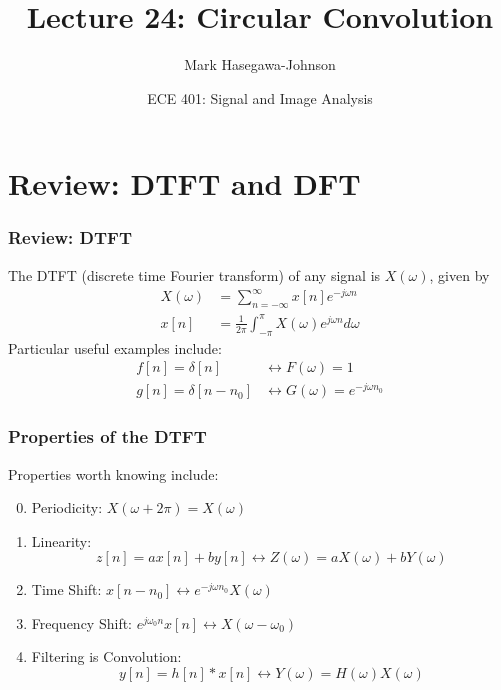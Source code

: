\documentclass{beamer}
\title{Lecture 24: Circular Convolution}
\author{Mark Hasegawa-Johnson}
\date{ECE 401: Signal and Image Analysis}
\begin{document}
\begin{frame}
  \maketitle
\end{frame}

\begin{frame}
  \tableofcontents
\end{frame}

\section[Review]{Review: DTFT and DFT}
\setcounter{subsection}{1}

\begin{frame}
  \frametitle{Review: DTFT}

  The DTFT (discrete time Fourier transform) of any signal is
  $X(\omega)$, given by
  \begin{align*}
    X(\omega) &= \sum_{n=-\infty}^\infty x[n]e^{-j\omega n}\\
    x[n] &= \frac{1}{2\pi}\int_{-\pi}^\pi X(\omega)e^{j\omega n}d\omega
  \end{align*}
  Particular useful examples include:
  \begin{align*}
    f[n]=\delta[n] &\leftrightarrow F(\omega)=1\\
    g[n]=\delta[n-n_0] &\leftrightarrow G(\omega)=e^{-j\omega n_0}
  \end{align*}
\end{frame}

\begin{frame}
  \frametitle{Properties of the DTFT}

  Properties worth knowing  include:
  \begin{enumerate}
    \setcounter{enumi}{-1}
  \item Periodicity: $X(\omega+2\pi)=X(\omega)$
  \item Linearity:
    \[z[n]=ax[n]+by[n]\leftrightarrow Z(\omega)=aX(\omega)+bY(\omega)
    \]
  \item Time Shift: $x[n-n_0]\leftrightarrow e^{-j\omega n_0}X(\omega)$
  \item Frequency Shift: $e^{j\omega_0 n}x[n]\leftrightarrow X(\omega-\omega_0)$
  \item Filtering is Convolution:
    \[
    y[n]=h[n]\ast x[n]\leftrightarrow Y(\omega)=H(\omega)X(\omega)
    \]
  \end{enumerate}
\end{frame}
\end{document}
